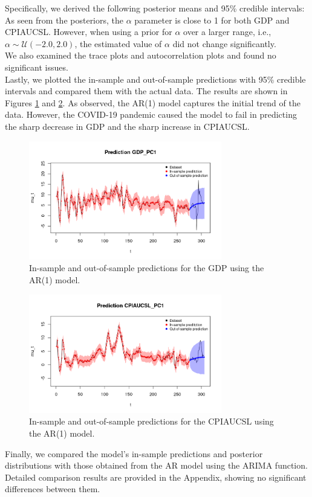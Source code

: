 Specifically, we derived the following posterior means and 95\% credible intervals: \\
As seen from the posteriors, the $\alpha$ parameter is close to 1 for both GDP and CPIAUCSL. However, when using a prior for $\alpha$ over a larger range, i.e., $\alpha \sim \mathcal{U}(-2.0, 2.0)$, the estimated value of $\alpha$ did not change significantly. \\
We also examined the trace plots and autocorrelation plots and found no significant issues. \\
Lastly, we plotted the in-sample and out-of-sample predictions with 95\% credible intervals and compared them with the actual data. The results are shown in Figures \ref{fig:AR1_gdp_prediction} and \ref{fig:AR1_infl_prediction}. As observed, the AR(1) model captures the initial trend of the data. However, the COVID-19 pandemic caused the model to fail in predicting the sharp decrease in GDP and the sharp increase in CPIAUCSL. \\
\begin{figure}[H]
    \centering
    \includegraphics[width=0.75\textwidth]{images/2-AR/gdp_prediction.png}
    \caption{In-sample and out-of-sample predictions for the GDP using the AR(1) model.}
    \label{fig:AR1_gdp_prediction}
\end{figure}
\begin{figure}[H]
    \centering
    \includegraphics[width=0.75\textwidth]{images/2-AR/infl_prediction.png}
    \caption{In-sample and out-of-sample predictions for the CPIAUCSL using the AR(1) model.}
    \label{fig:AR1_infl_prediction}
\end{figure}
Finally, we compared the model's in-sample predictions and posterior distributions with those obtained from the AR model using the ARIMA function. Detailed comparison results are provided in the Appendix, showing no significant differences between them.